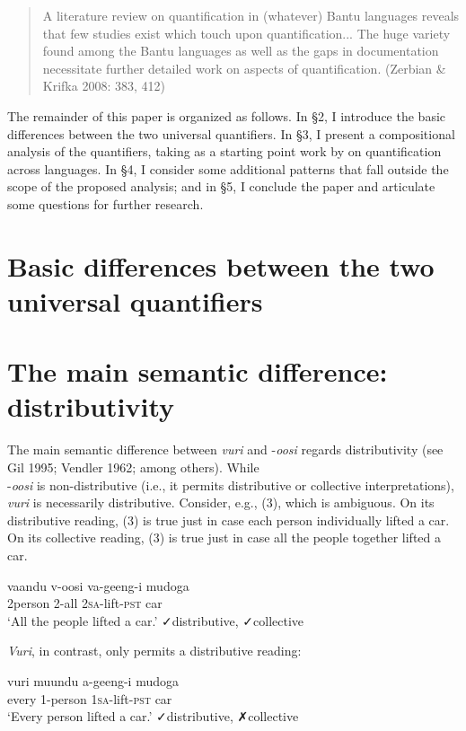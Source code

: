 \documentclass[output=paper]{langsci/langscibook}
\begin{document}
\begin{quote}
A literature review on quantification in (whatever) Bantu languages reveals that few studies exist which touch upon quantification... The huge variety found among the Bantu languages as well as the gaps in documentation necessitate further detailed work on aspects of quantification. (Zerbian \& Krifka 2008: 383, 412) 
\end{quote}

  The remainder of this paper is organized as follows. In §2, I introduce the basic differences between the two universal quantifiers. In §3, I present a compositional analysis of the quantifiers, taking as a starting point work by \citet{Matthewson2013} on quantification across languages. In §4, I consider some additional patterns that fall outside the scope of the proposed analysis; and in §5, I conclude the paper and articulate some questions for further research.

\section{Basic differences between the two universal quantifiers}

\section{The main semantic difference: distributivity} 

The main semantic difference between \textit{vuri} and -\textit{oosi} regards distributivity (see Gil 1995; Vendler 1962; among others). While \\
{}-\textit{oosi} is non-distributive (i.e., it permits distributive or collective interpretations), \textit{vuri} is necessarily distributive. Consider, e.g., (3), which is ambiguous. On its distributive reading, (3) is true just in case each person individually lifted a car. On its collective reading, (3) is true just in case all the people together lifted a car.

\ea
\gll vaandu  v-oosi    va-geeng-i    mudoga\\
     2person  2-all    2\textsc{sa}{}-lift-\textsc{pst}    car\\
\glt ‘All the people lifted a car.’  ✓distributive, ✓collective
\z

\textit{Vuri}, in contrast, only permits a distributive reading:

\ea
\gll vuri  muundu  a-geeng-i    mudoga\\
     every  1-person  1\textsc{sa}{}-lift-\textsc{pst}    car\\
\glt ‘Every person lifted a car.’  ✓distributive, ✗collective
\z
\end{document}
